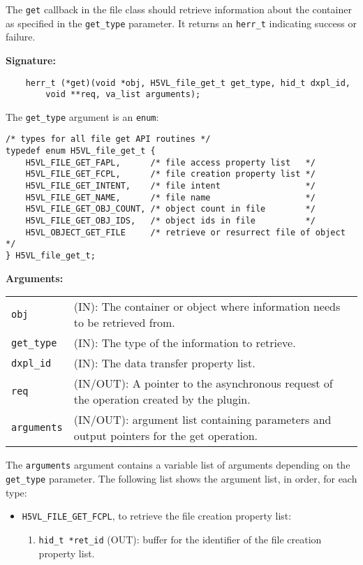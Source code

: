 The \texttt{get} callback in the file class should retrieve
information about the container as specified in the \texttt{get\_type}
parameter. It returns an \texttt{herr\_t} indicating success or failure.\bigskip

\begin{mdframed}[style=bgbox] 
\textbf{Signature:}
\begin{lstlisting}
    herr_t (*get)(void *obj, H5VL_file_get_t get_type, hid_t dxpl_id, 
        void **req, va_list arguments);
\end{lstlisting}

The \texttt{get\_type} argument is an \texttt{enum}:
\begin{lstlisting}
/* types for all file get API routines */
typedef enum H5VL_file_get_t {
    H5VL_FILE_GET_FAPL,      /* file access property list   */
    H5VL_FILE_GET_FCPL,      /* file creation property list */
    H5VL_FILE_GET_INTENT,    /* file intent                 */
    H5VL_FILE_GET_NAME,      /* file name                   */
    H5VL_FILE_GET_OBJ_COUNT, /* object count in file        */
    H5VL_FILE_GET_OBJ_IDS,   /* object ids in file          */
    H5VL_OBJECT_GET_FILE     /* retrieve or resurrect file of object */
} H5VL_file_get_t;
\end{lstlisting}

\textbf{Arguments:}\\
\begin{tabular}{l p{10cm}}
  \texttt{obj} & (IN): The container or object where information needs to be
  retrieved from.\\
  \texttt{get\_type} & (IN): The type of the information to retrieve.\\
  \texttt{dxpl\_id} & (IN): The data transfer property list.\\
  \texttt{req} & (IN/OUT): A pointer to the asynchronous request of the
  operation created by the plugin.\\
  \texttt{arguments} & (IN/OUT): argument list containing parameters and
  output pointers for the get operation. \\
\end{tabular}

The \texttt{arguments} argument contains a variable list of arguments
depending on the \texttt{get\_type} parameter. The following list shows
the argument list, in order, for each type:

\begin{itemize}
\item \texttt{H5VL\_FILE\_GET\_FCPL}, to retrieve the file creation
  property list:
  \begin{enumerate}
  \item \texttt{hid\_t *ret\_id} (OUT): buffer for the identifier of the
    file creation property list.
  \end{enumerate}


\end{itemize}
\end{mdframed}
